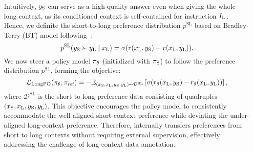 
Intuitively, $y_\text{S}$ can serve as a high-quality answer even when giving the whole long context, as its conditioned context is self-contained for instruction $I_\text{L}$. Hence, we definite the short-to-long preference distribution $p^{\text{SL}}$ based on Bradley-Terry (BT) model following~:
\begin{equation}
\label{eq:stl_bt_model}
    p^{\text{SL}}(y_\text{S} \succ y_\text{L} \mid x_\text{L})= \sigma(r(x_\text{L}, y_\text{S})- r(x_\text{L}, y_\text{L})).
\end{equation}
We now steer a policy model $\pi_\theta$ (initialized with $\pi_\text{S}$) to follow the preference distribution $p^{\text{SL}}$, forming the \ourMethod{} objective:
\begin{equation}
    \label{eq:longpo_init}
        \mathcal{L}_{\text{LongPO}}(\pi_\theta; \pi_{\text{ref}}) = - \mathbb{E}_{(x_\text{S}, x_\text{L}, y_\text{S}, y_\text{L}) \sim \mathcal{D}^{\text{SL}}}\left[\sigma(r_\theta(x_\text{L}, y_\text{S})- r_\theta(x_\text{L}, y_\text{L}))\right],
\end{equation}
where $\mathcal{D}^{\text{SL}}$ is the short-to-long preference data consisting of quadruples $\left(x_\text{S}, x_\text{L}, y_\text{S}, y_\text{L}\right)$.
This objective encourages the policy model to consistently accommodate the well-aligned short-context preference while deviating the under-aligned long-context preference. Therefore, \ourMethod{} internally transfers preferences from short to long contexts without requiring external supervision, effectively addressing the challenge of long-context data annotation.








